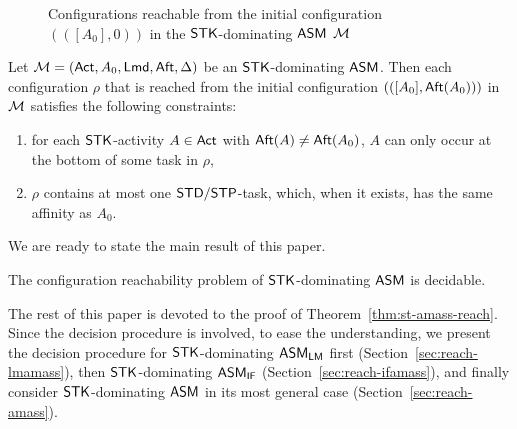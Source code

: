 \begin{example}
\begin{figure}
			\caption{Configurations reachable from the initial configuration $(([A_0], 0))$ in the $\mathsf{STK}$-dominating $\textsf{ASM}$ ${\mathcal{M} }$}
		\label{stk-asm-example}
	\end{figure}

\end{example}


\begin{proposition}\label{prop-stk}
    Let ${\mathcal{M} }=({\sf Act},A_0,{\sf Lmd},{\sf Aft},\Delta)$ be an $\mathsf{STK}$-dominating $\textsf{ASM}$. Then each configuration $\rho$ that is reached from the initial configuration $(([A_0],{\sf Aft}(A_0)))$ in ${\mathcal{M} }$ satisfies the following constraints:
    \begin{enumerate}
        \item for each $\mathsf{STK}$-activity $A\in{\sf Act}$ with ${\sf Aft}(A)\neq{\sf Aft}(A_0)$, $A$ can only occur at the bottom of some task in $\rho$, 
        \item $\rho$ contains at most one ${\sf STD}/{\sf STP}$-task, which, when it exists, has the same affinity as $A_0$.
    \end{enumerate}
\end{proposition}

We are ready to state the main result of this paper. 

\begin{theorem}\label{thm:st-amass-reach}
The configuration reachability problem of $\mathsf{STK}$-dominating $\textsf{ASM}$ is decidable.
\end{theorem}

The rest of this paper is devoted to the proof of Theorem~\ref{thm:st-amass-reach}. Since the decision procedure is involved, to ease the understanding, we present the decision procedure for ${\sf STK}$-dominating $\textsf{ASM}_\textsf{LM}$ first (Section~\ref{sec:reach-lmamass}), then ${\sf STK}$-dominating $\textsf{ASM}_\textsf{IF}$ (Section~\ref{sec:reach-ifamass}), and finally consider ${\sf STK}$-dominating $\textsf{ASM}$ in its most general case (Section~\ref{sec:reach-amass}). 

